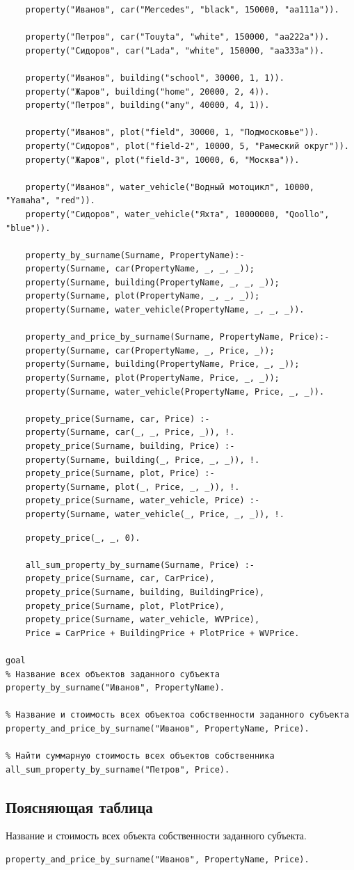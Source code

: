 \begin{lstlisting}	
	property("Иванов", car("Mercedes", "black", 150000, "aa111a")).
	
	property("Петров", car("Touyta", "white", 150000, "aa222a")).
	property("Сидоров", car("Lada", "white", 150000, "aa333a")).
	
	property("Иванов", building("school", 30000, 1, 1)).
	property("Жаров", building("home", 20000, 2, 4)).
	property("Петров", building("any", 40000, 4, 1)).
	
	property("Иванов", plot("field", 30000, 1, "Подмосковье")).
	property("Сидоров", plot("field-2", 10000, 5, "Рамеский округ")).
	property("Жаров", plot("field-3", 10000, 6, "Москва")).
	
	property("Иванов", water_vehicle("Водный мотоцикл", 10000, "Yamaha", "red")).
	property("Сидоров", water_vehicle("Яхта", 10000000, "Qoollo", "blue")).
	
	property_by_surname(Surname, PropertyName):-
	property(Surname, car(PropertyName, _, _, _));
	property(Surname, building(PropertyName, _, _, _));
	property(Surname, plot(PropertyName, _, _, _));
	property(Surname, water_vehicle(PropertyName, _, _, _)).
	
	property_and_price_by_surname(Surname, PropertyName, Price):-
	property(Surname, car(PropertyName, _, Price, _));
	property(Surname, building(PropertyName, Price, _, _));
	property(Surname, plot(PropertyName, Price, _, _));
	property(Surname, water_vehicle(PropertyName, Price, _, _)).
	
	propety_price(Surname, car, Price) :-
	property(Surname, car(_, _, Price, _)), !.
	propety_price(Surname, building, Price) :-
	property(Surname, building(_, Price, _, _)), !.
	propety_price(Surname, plot, Price) :-
	property(Surname, plot(_, Price, _, _)), !.
	propety_price(Surname, water_vehicle, Price) :-
	property(Surname, water_vehicle(_, Price, _, _)), !.        
\end{lstlisting}
\clearpage
\begin{lstlisting}
	propety_price(_, _, 0).
	
	all_sum_property_by_surname(Surname, Price) :-
	propety_price(Surname, car, CarPrice),
	propety_price(Surname, building, BuildingPrice),
	propety_price(Surname, plot, PlotPrice),
	propety_price(Surname, water_vehicle, WVPrice),
	Price = CarPrice + BuildingPrice + PlotPrice + WVPrice.

goal
% Название всех объектов заданного субъекта
property_by_surname("Иванов", PropertyName).

% Название и стоимость всех объектоа собственности заданного субъекта
property_and_price_by_surname("Иванов", PropertyName, Price).

% Найти суммарную стоимость всех объектов собственника
all_sum_property_by_surname("Петров", Price).
\end{lstlisting}

\subsection*{Поясняющая таблица}

Название и стоимость всех объекта собственности заданного субъекта.
\begin{lstlisting}
property_and_price_by_surname("Иванов", PropertyName, Price).
\end{lstlisting}